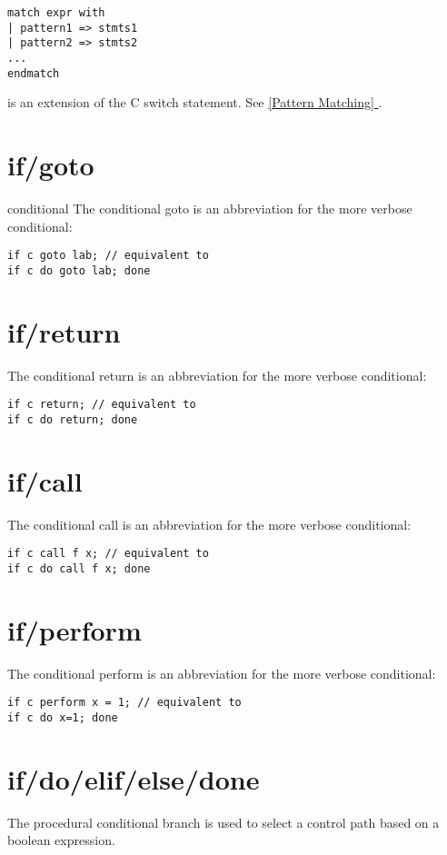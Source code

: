 \documentclass[oneside]{book}
\newcommand*{\fullref}[1]{\hyperref[{#1}]{\autoref*{#1} \nameref*{#1}}}
\begin{document}
\begin{verbatim}
match expr with
| pattern1 => stmts1
| pattern2 => stmts2
...
endmatch
\end{verbatim}

is an extension of the C switch statement. See \fullref{Pattern Matching}.

\section{if/goto}{conditional}
The conditional goto is an abbreviation for 
the more verbose conditional:

\begin{verbatim}
if c goto lab; // equivalent to
if c do goto lab; done
\end{verbatim}


\section{if/return}
The conditional return is an abbreviation for
the more verbose conditional:

\begin{verbatim}
if c return; // equivalent to
if c do return; done
\end{verbatim}


\section{if/call}
The conditional call is an abbreviation for
the more verbose conditional:

\begin{verbatim}
if c call f x; // equivalent to
if c do call f x; done
\end{verbatim}

\section{if/perform}
The conditional perform is an abbreviation for
the more verbose conditional:

\begin{verbatim}
if c perform x = 1; // equivalent to
if c do x=1; done
\end{verbatim}

\section{if/do/elif/else/done}
The procedural conditional branch is used to select
a control path based on a boolean expression.
\end{document}
